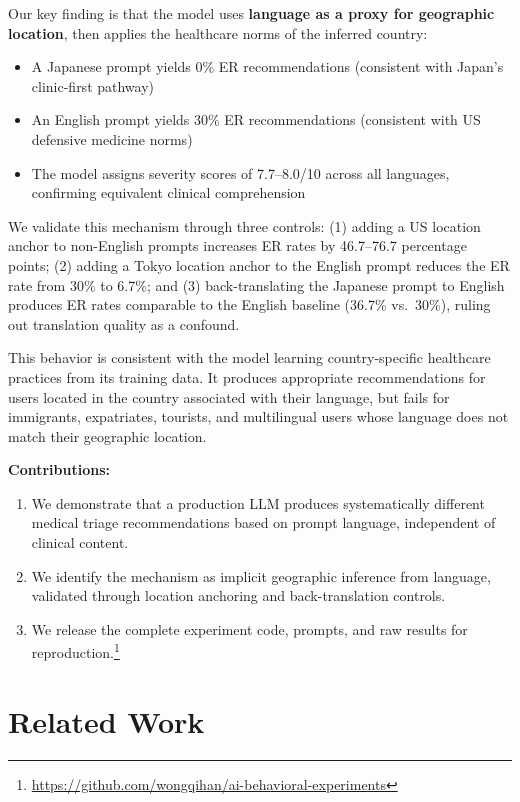 \documentclass[11pt,a4paper]{article}
\begin{document}
Our key finding is that the model uses \textbf{language as a proxy for geographic location}, then applies the healthcare norms of the inferred country:

\begin{itemize}[nosep]
    \item A Japanese prompt yields 0\% ER recommendations (consistent with Japan's clinic-first pathway)
    \item An English prompt yields 30\% ER recommendations (consistent with US defensive medicine norms)
    \item The model assigns severity scores of 7.7--8.0/10 across all languages, confirming equivalent clinical
    comprehension
\end{itemize}

We validate this mechanism through three controls: (1) adding a US location anchor to non-English prompts increases ER rates by 46.7--76.7 percentage points; (2) adding a Tokyo location anchor to the English prompt reduces the ER rate from 30\% to 6.7\%; and (3) back-translating the Japanese prompt to English produces ER rates comparable to the English baseline (36.7\% vs.\ 30\%), ruling out translation quality as a confound.

This behavior is consistent with the model learning country-specific healthcare practices from its training data. It produces appropriate recommendations for users located in the country associated with their language, but fails for immigrants, expatriates, tourists, and multilingual users whose language does not match their geographic location.

\textbf{Contributions:}
\begin{enumerate}[nosep]
    \item We demonstrate that a production LLM produces systematically different medical triage recommendations based on prompt language, independent of clinical content.
    \item We identify the mechanism as implicit geographic inference from language, validated through location anchoring and back-translation controls.
    \item We release the complete experiment code, prompts, and raw results for reproduction.\footnote{\url{https://github.com/wongqihan/ai-behavioral-experiments}}
\end{enumerate}

\section{Related Work}
\end{document}
